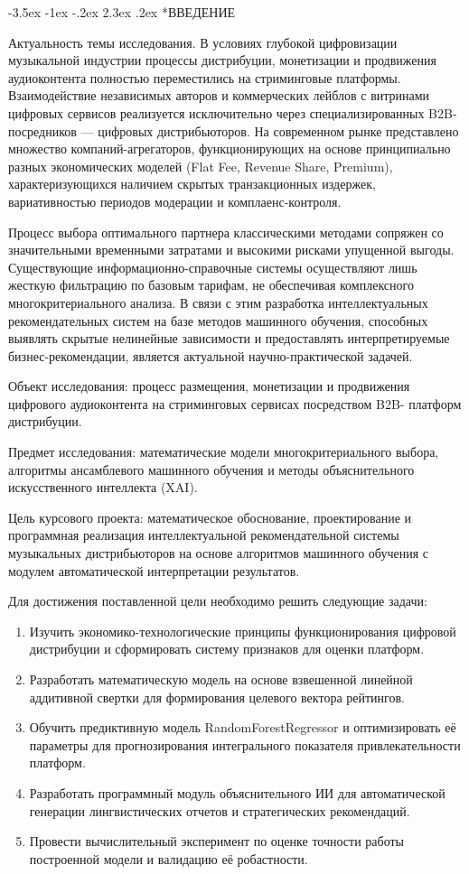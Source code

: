 \documentclass[14pt, a4paper]{extarticle}
\makeatletter
\renewcommand\section{\@startsection {section}{1}{\z@}%
 {-3.5ex \@plus -1ex \@minus -.2ex}%
 {2.3ex \@plus.2ex}%
{\centering\normalfont\Large\bfseries}}
\makeatother
\begin{document}
\section*{ВВЕДЕНИЕ}

Актуальность темы исследования. В условиях глубокой цифровизации музыкальной индустрии процессы дистрибуции, монетизации и продвижения аудиоконтента полностью переместились на стриминговые платформы. Взаимодействие независимых авторов и коммерческих лейблов с витринами цифровых сервисов реализуется исключительно через специализированных B2B-посредников — цифровых дистрибьюторов. На современном рынке представлено множество компаний-агрегаторов, функционирующих на основе принципиально разных экономических моделей (Flat Fee, Revenue Share, Premium), характеризующихся наличием скрытых транзакционных издержек, вариативностью периодов модерации и комплаенс-контроля. 

Процесс выбора оптимального партнера классическими методами сопряжен со значительными временными затратами и высокими рисками упущенной выгоды. Существующие информационно-справочные системы осуществляют лишь жесткую фильтрацию по базовым тарифам, не обеспечивая комплексного многокритериального анализа. В связи с этим разработка интеллектуальных рекомендательных систем на базе методов машинного обучения, способных выявлять скрытые нелинейные зависимости и предоставлять интерпретируемые бизнес-рекомендации, является актуальной научно-практической задачей.

Объект исследования: процесс размещения, монетизации и продвижения цифрового аудиоконтента на стриминговых сервисах посредством B2B- платформ дистрибуции.

Предмет исследования: математические модели многокритериального выбора, алгоритмы ансамблевого машинного обучения и методы объяснительного искусственного интеллекта (XAI).

Цель курсового проекта: математическое обоснование, проектирование и программная реализация интеллектуальной рекомендательной системы музыкальных дистрибьюторов на основе алгоритмов машинного обучения с модулем автоматической интерпретации результатов.

Для достижения поставленной цели необходимо решить следующие задачи:
\begin{enumerate}
    \item Изучить экономико-технологические принципы функционирования цифровой дистрибуции и сформировать систему признаков для оценки платформ.
    \item Разработать математическую модель на основе взвешенной линейной аддитивной свертки для формирования целевого вектора рейтингов.
    \item Обучить предиктивную модель RandomForestRegressor и оптимизировать её параметры для прогнозирования интегрального показателя привлекательности платформ.
    \item Разработать программный модуль объяснительного ИИ для автоматической генерации лингвистических отчетов и стратегических рекомендаций.
    \item Провести вычислительный эксперимент по оценке точности работы построенной модели и валидацию её робастности.
\end{enumerate}
\end{document}
